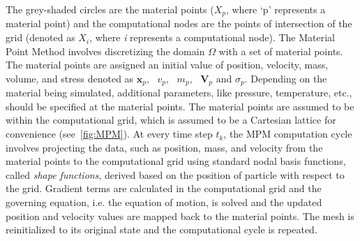 The grey-shaded circles are the material points ($X_{p}$, where `p' represents 
a material point) and the computational nodes are the points of intersection of 
the grid (denoted as $X_{i}$, where \textit{i} represents a computational 
node). The Material Point Method involves discretizing the domain $\Omega$ with 
a set of material points. The material points are assigned an initial value of 
position, velocity, mass, volume, and stress denoted as $\mathbf{x}_{p},\mbox{  
} \mathbf{\mathit{v}}_{p},\mbox{  } \mathit{m}_{p}, \mbox{  
}\mathbf{V}_{p}\mbox{ and }\sigma_{p} $. Depending on the material being 
simulated, additional parameters, like pressure, temperature, etc., should be 
specified at the material points. The material points are assumed to be within 
the computational grid, which is assumed to be a Cartesian lattice for 
convenience (see~\cref{fig:MPM}). At every time step $\mathit{t}_{k}$, 
the MPM computation cycle involves projecting the data, such as position, mass, 
and velocity from the material points to the computational grid using standard 
nodal basis functions, called \textit{shape functions}, derived based on the 
position of particle with respect to the grid. Gradient terms are calculated in 
the computational grid and the governing equation, i.e. the equation of motion, 
is solved and the updated position and velocity values are mapped back to the 
material points. The mesh is reinitialized to its original state and the 
computational cycle is repeated. 

